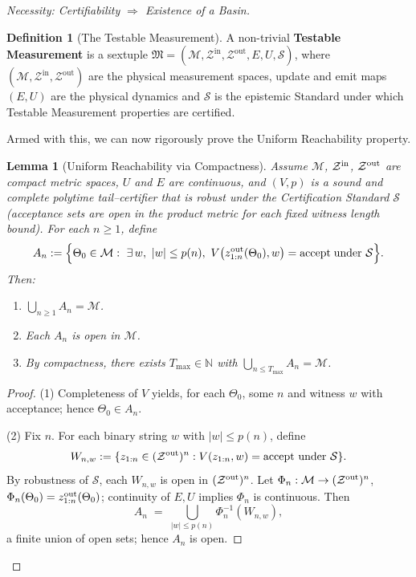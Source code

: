 \documentclass[12pt]{article}
\theoremstyle{definition}
\newtheorem{definition}{Definition}[section]
\theoremstyle{plain}
\newtheorem{lemma}{Lemma}[section]
\begin{document}
\begin{proof}[Necessity: Certifiability $\Rightarrow$ Existence of a Basin]
\begin{definition}[The Testable Measurement]
A non-trivial \textbf{Testable Measurement} is a sextuple $\mathfrak{M} = (\mathcal{M}, \mathcal{Z}^{\text{in}}, \mathcal{Z}^{\text{out}}, E, U, \mathcal{S})$, where $(\mathcal{M}, \mathcal{Z}^{\text{in}}, \mathcal{Z}^{\text{out}})$ are the physical measurement spaces, update and emit maps $(E, U)$ are the physical dynamics and $\mathcal{S}$ is the epistemic Standard under which Testable Measurement properties are certified.
\end{definition}

Armed with this, we can now rigorously prove the Uniform Reachability property.


\begin{lemma}[Uniform Reachability via Compactness]
\label{lem:reachability-uniform}
Assume $\mathcal M$, $\mathcal Z^{\rm in}$, $\mathcal Z^{\rm out}$ are compact metric spaces, $U$ and $E$ are continuous, and $(V,p)$ is a sound and complete polytime tail–certifier that is \emph{robust} under the Certification Standard $\mathcal S$ (acceptance sets are open in the product metric for each fixed witness length bound).
For each $n\ge1$, define
\[
  A_n := \Bigl\{\Theta_0\in\mathcal M:\ \exists\,w,\ |w|\le p(n),\ V\bigl(z^{\rm out}_{1:n}(\Theta_0),w\bigr)=\mathrm{accept\; under}\ \mathcal S\Bigr\}.
\]
Then:
\begin{enumerate}
  \item $\bigcup_{n\ge1}A_n=\mathcal M$.
  \item Each $A_n$ is open in $\mathcal M$.
  \item By compactness, there exists $T_{\max}\in\mathbb N$ with $\bigcup_{n\le T_{\max}}A_n=\mathcal M$.
\end{enumerate}
\end{lemma}

\begin{proof}
(1) Completeness of $V$ yields, for each $\Theta_0$, some $n$ and witness $w$ with acceptance; hence $\Theta_0\in A_n$.

(2) Fix $n$. For each binary string $w$ with $|w|\le p(n)$, define
\[
  W_{n,w} := \{z_{1:n}\in(\mathcal Z^{\rm out})^n: V(z_{1:n},w)=\mathrm{accept\ under}\ \mathcal S\}.
\]
By robustness of $\mathcal S$, each $W_{n,w}$ is open in $(\mathcal Z^{\rm out})^n$. Let $\Phi_n:\mathcal M\to(\mathcal Z^{\rm out})^n$, $\Phi_n(\Theta_0)=z^{\rm out}_{1:n}(\Theta_0)$; continuity of $E,U$ implies $\Phi_n$ is continuous. Then
\[
  A_n \;=\; \bigcup_{|w|\le p(n)} \Phi_n^{-1}(W_{n,w}),
\]
a finite union of open sets; hence $A_n$ is open.


\end{proof}
\end{proof}
\end{document}
